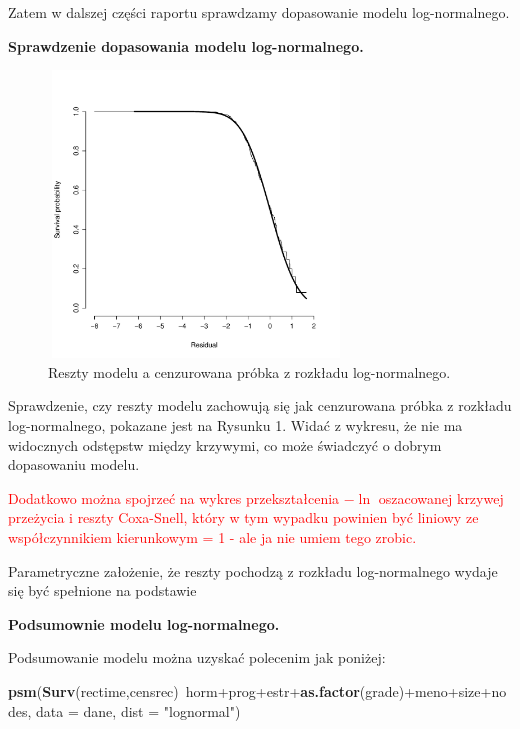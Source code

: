 \documentclass[]{article}
\newenvironment{Shaded}{}{}
\newcommand{\KeywordTok}[1]{\textcolor[rgb]{0.00,0.44,0.13}{\textbf{{#1}}}}
\newcommand{\DataTypeTok}[1]{\textcolor[rgb]{0.56,0.13,0.00}{{#1}}}
\newcommand{\StringTok}[1]{\textcolor[rgb]{0.25,0.44,0.63}{{#1}}}
\newcommand{\NormalTok}[1]{{#1}}
\begin{document}
Zatem w dalszej części raportu sprawdzamy dopasowanie modelu
log-normalnego.

\textbf{Sprawdzenie dopasowania modelu log-normalnego.}

\begin{figure}[hbt!]
  \vspace{-20pt}
  \begin{center}
     \includegraphics[width=0.7\textwidth, height=3in]{lognormal.pdf}
  \end{center}
  \vspace{-20pt}
  \label{fig:sc}
  \caption{Reszty modelu a cenzurowana próbka z rozkładu log-normalnego.}

\end{figure}

Sprawdzenie, czy reszty modelu zachowują się jak cenzurowana próbka z
rozkładu log-normalnego, pokazane jest na Rysunku 1. Widać z wykresu, że
nie ma widocznych odstępstw między krzywymi, co może świadczyć o dobrym
dopasowaniu modelu.

\textcolor{red}{Dodatkowo można spojrzeć na wykres przekształcenia $-\ln$ oszacowanej krzywej przeżycia i reszty Coxa-Snell, który w tym wypadku powinien być liniowy ze współczynnikiem kierunkowym = 1 - ale ja nie umiem tego zrobic.}

Parametryczne założenie, że reszty pochodzą z rozkładu log-normalnego
wydaje się być spełnione na podstawie 

\textbf{ Podsumownie modelu log-normalnego.}

Podsumowanie modelu można uzyskać polecenim jak poniżej:

\begin{Shaded}
\begin{Highlighting}[]
\KeywordTok{psm}\NormalTok{(}\KeywordTok{Surv}\NormalTok{(rectime,censrec)~horm+prog+estr+}\KeywordTok{as.factor}\NormalTok{(grade)+meno+size+nodes, }
        \DataTypeTok{data =} \NormalTok{dane, }\DataTypeTok{dist =} \StringTok{"lognormal"}\NormalTok{)}
\end{Highlighting}
\end{Shaded}
\end{document}

